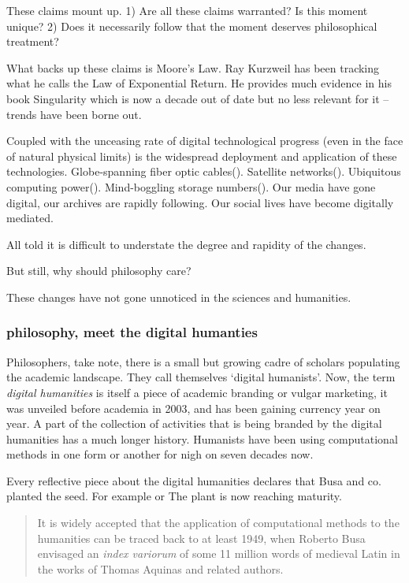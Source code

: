 \documentclass[dah,phd,a4paper]{xe_uccthesis}
\begin{document}
These claims mount up. 1) Are all these claims warranted? Is this moment unique? 2) Does it necessarily follow that the moment deserves philosophical treatment?

What backs up these claims is Moore's Law. Ray Kurzweil has been tracking what he calls the Law of Exponential Return. He provides much evidence in his book Singularity\citep{kurzweil_singularity_2005} which is now a decade out of date but no less relevant for it -- trends have been borne out.

Coupled with the unceasing rate of digital technological progress (even in the face of natural physical limits) is the widespread deployment and application of these technologies. Globe-spanning fiber optic cables(). Satellite networks(). Ubiquitous computing power(). Mind-boggling storage numbers(). Our media have gone digital, our archives are rapidly following. Our social lives have become digitally mediated.

All told it is difficult to understate the degree and rapidity of the changes.

But still, why should philosophy care? 

These changes have not gone unnoticed in the sciences and humanities.

\subsubsection{philosophy, meet the digital humanties}

Philosophers, take note, there is a small but growing cadre of scholars populating the academic landscape. They call themselves ‘digital humanists’. Now, the term \emph{digital humanities} is itself a piece of academic branding or vulgar marketing, it was unveiled before academia in 2003, and has been gaining currency year on year. A part of the collection of activities that is being branded by the digital humanities has a much longer history. Humanists have been using computational methods in one form or another for nigh on seven decades now.

Every reflective piece about the digital humanities declares that Busa and co. planted the seed. For example \citep{jockers_macroanalysis:_2013} or \citep{berry_computational_2011} The plant is now reaching maturity.

\begin{quotation}
It is widely accepted that the application of computational methods to the humanities can be traced back to at least 1949, when Roberto Busa envisaged an \emph{index variorum} of some 11 million words of medieval Latin in the works of Thomas Aquinas and related authors.
\begin{flushright}
\cite{nyhan_oral_2015}
\end{flushright}
\end{quotation}
\end{document}
